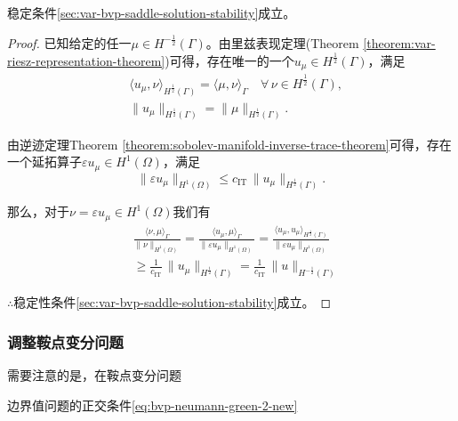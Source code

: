 \begin{lemma}[鞍点变分形式狄利克雷边界值问题解的稳定条件]
  \label{lemma:var-bvp-saddle-solution-stability}
  稳定条件\eqref{sec:var-bvp-saddle-solution-stability}成立。
\end{lemma}
\begin{proof}
  已知给定的任一$\mu \in H^{-\frac{1}{2}}(\Gamma)$。由里兹表现定理(Theorem \ref{theorem:var-riesz-representation-theorem})可得，存在唯一的一个$u_{\mu} \in H^{\frac{1}{2}}(\Gamma)$，满足
  \begin{equation*}
    \begin{split}
      & \langle u_{\mu}, \nu \rangle_{H^{\frac{1}{2}}(\Gamma)} = \langle \mu, \nu \rangle_{\Gamma} \quad \forall \, \nu \in H^{\frac{1}{2}}(\Gamma), \\
      & \big\| u_{\mu} \big\|_{H^{\frac{1}{2}}(\Gamma)} = \big\| \mu \big\|_{H^{\frac{1}{2}}(\Gamma)}.
    \end{split}
  \end{equation*}

  由逆迹定理Theorem \ref{theorem:sobolev-manifold-inverse-trace-theorem}可得，存在一个延拓算子$\varepsilon u_{\mu} \in H^{1}(\Omega)$，满足
  \begin{equation*}
    \big\| \varepsilon u_{\mu} \big\|_{H^{1}(\Omega)} \le c_{\text{IT}} \, \big\| u_{\mu} \big\|_{H^{\frac{1}{2}}(\Gamma)}.
  \end{equation*}

  那么，对于$\nu = \varepsilon u_{\mu} \in H^{1}(\Omega)$我们有
  \begin{equation*}
    \begin{split}
      & \frac{
      \langle \nu, \mu \rangle_{\Gamma}
      }{
      \big\| \nu \big\|_{H^{1}(\Omega)}
      }
      =
      \frac{
      \langle u_{\mu}, \mu \rangle_{\Gamma}
      }{
      \big\| \varepsilon u_{\mu} \big\|_{H^{1}(\Omega)}
      }
      =
      \frac{
      \langle u_{\mu}, u_{\mu} \rangle_{H^{\frac{1}{2}}(\Gamma)}
      }{\big\| \varepsilon u_{\mu} \big\|_{H^{1}(\Omega)}}\\
      & \ge \frac{1}{c_{\text{IT}}} \,
      \big\| u_{\mu} \big\|_{H^{\frac{1}{2}}(\Gamma)}
      = \frac{1}{c_{\text{IT}}} \,
      \big\| u \big\|_{H^{- \frac{1}{2}}(\Gamma)}
    \end{split}
  \end{equation*}

  $\therefore$稳定性条件\eqref{sec:var-bvp-saddle-solution-stability}成立。
\end{proof}

\subsubsection{调整鞍点变分问题}
\label{sec:var-bvp-saddle-modified}
需要注意的是，在鞍点变分问题


边界值问题的正交条件\eqref{eq:bvp-neumann-green-2-new}

